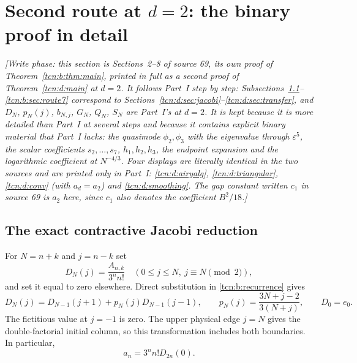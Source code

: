 \documentclass[11pt,letterpaper]{article}
\newcommand{\eps}{\varepsilon}
\theoremstyle{remark}
\begin{document}
\section{Second route at \texorpdfstring{$d=2$}{d = 2}: the binary proof in detail}\label{tcn:b:sec:route}
\emph{[Write phase: this section is Sections~2--8 of source 69, its own proof of Theorem~\ref{tcn:b:thm:main}, printed in full as a second proof of Theorem~\ref{tcn:d:main} at $d=2$. It follows Part~I step by step: Subsections~\ref{tcn:b:sec:route1}--\ref{tcn:b:sec:route7} correspond to Sections~\ref{tcn:d:sec:jacobi}--\ref{tcn:d:sec:transfer}, and $D_N$, $p_N(j)$, $b_{N,j}$, $G_N$, $Q_N$, $S_N$ are Part~I's at $d=2$. It is kept because it is more detailed than Part~I at several steps and because it contains explicit binary material that Part~I lacks: the quasimode $\phi_2,\phi_3$ with the eigenvalue through $\eps^5$, the scalar coefficients $s_2,\dots,s_7$, $h_1,h_2,h_3$, the endpoint expansion and the logarithmic coefficient at $N^{-4/3}$. Four displays are literally identical in the two sources and are printed only in Part~I: \eqref{tcn:d:airyalg}, \eqref{tcn:d:triangular}, \eqref{tcn:d:conv} (with $a_d=a_2$) and \eqref{tcn:d:smoothing}. The gap constant written $c_1$ in source 69 is $a_2$ here, since $c_1$ also denotes the coefficient $B^2/18$.]}

\subsection{The exact contractive Jacobi reduction}\label{tcn:b:sec:route1}
For $N=n+k$ and $j=n-k$ set
\[
 D_N(j)=\frac{A_{n,k}}{3^n n!}\quad
 (0\le j\le N,\ j\equiv N\pmod2),
\]
and set it equal to zero elsewhere. Direct substitution in \eqref{tcn:b:recurrence} gives
\begin{equation}
 D_N(j)=D_{N-1}(j+1)+p_N(j)D_{N-1}(j-1),\qquad
 p_N(j)=\frac{3N+j-2}{3(N+j)},\qquad D_0=e_0.
 \label{tcn:b:drec}
\end{equation}
The fictitious value at $j=-1$ is zero. The upper physical edge $j=N$ gives the double-factorial initial column, so this transformation includes both boundaries. In particular,
\begin{equation}a_n=3^n n!D_{2n}(0).\label{tcn:b:recover-a}\end{equation}
\end{document}
